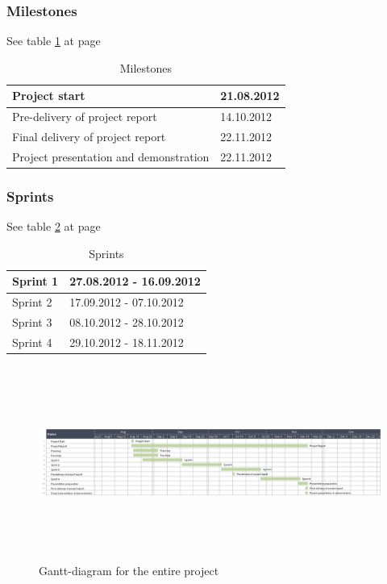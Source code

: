 \subsubsection*{Milestones}
See table \ref{tab:milestones} at page \pageref{tab:milestones}
\begin{table}
\begin{tabular}{l|l}
Project start &  21.08.2012\\ \hline
Pre-delivery of project report & 14.10.2012\\ \hline
Final delivery of project report & 22.11.2012\\ \hline
Project presentation and demonstration & 22.11.2012
\end{tabular}
\caption{Milestones} \label{tab:milestones}
\end{table}

\subsubsection*{Sprints}
See table \ref{tab:sprints} at page \pageref{tab:sprints}
\begin{table}
\begin{tabular}{l|l}
Sprint 1 &  27.08.2012 - 16.09.2012\\ \hline
Sprint 2 & 17.09.2012 - 07.10.2012\\ \hline
Sprint 3 & 08.10.2012 - 28.10.2012\\ \hline
Sprint 4 & 29.10.2012 - 18.11.2012
\end{tabular}
\caption{Sprints} \label{tab:sprints}
\end{table}

\begin{figure}[htb]
\begin{center}
\includegraphics[width=\textwidth, height=2.5in]{foo}
\caption{Gantt-diagram for the entire project}
\end{center}
\end{figure}